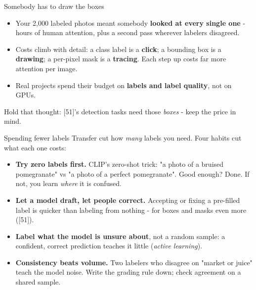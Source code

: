 \documentclass[aspectratio=169]{beamer}
\begin{document}
\begin{frame}{Somebody has to draw the boxes}
  \begin{itemize}
    \item Your 2,000 labeled photos meant somebody \textbf{looked at every single one} -
      hours of human attention, plus a second pass wherever labelers disagreed.
    \item Costs climb with detail: a class label is a \textbf{click}; a bounding box is a
      \textbf{drawing}; a per-pixel mask is a \textbf{tracing}. Each step up costs far
      more attention per image.
    \item Real projects spend their budget on \textbf{labels and label quality}, not on
      GPUs.
  \end{itemize}
  \vskip 8pt
  \vskip 6pt
  {\small Hold that thought: [51]'s detection tasks need those \emph{boxes} - keep the
  price in mind.}
\end{frame}

\begin{frame}{Spending fewer labels}
  Transfer cut how \emph{many} labels you need. Four habits cut what each one costs:
  \vskip 4pt
  \begin{itemize}\setlength\itemsep{3pt}
    \item \textbf{Try zero labels first.} CLIP's zero-shot trick: "a photo of a bruised
      pomegranate" vs "a photo of a perfect pomegranate". Good enough? Done. If not, you
      learn \emph{where} it is confused.
    \item \textbf{Let a model draft, let people correct.} Accepting or fixing a pre-filled
      label is quicker than labeling from nothing - for boxes and masks even more ([51]).
    \item \textbf{Label what the model is unsure about}, not a random sample: a confident,
      correct prediction teaches it little (\emph{active learning}).
    \item \textbf{Consistency beats volume.} Two labelers who disagree on "market or juice"
      teach the model noise. Write the grading rule down; check agreement on a shared sample.
  \end{itemize}
  \vskip 6pt
\end{frame}
\end{document}
